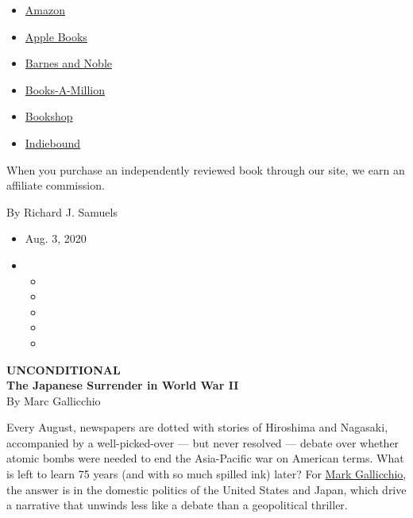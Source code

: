 \begin{itemize}
\tightlist
\item
  \href{https://www.amazon.com/gp/search?index=books\&tag=NYTBSREV-20\&field-keywords=Unconditional\%3A+The+Japanese+Surrender+in+World+War+II+Marc+Gallicchio}{Amazon}
\item
  \href{https://du-gae-books-dot-nyt-du-prd.appspot.com/buy?title=Unconditional\%3A+The+Japanese+Surrender+in+World+War+II\&author=Marc+Gallicchio}{Apple
  Books}
\item
  \href{https://www.anrdoezrs.net/click-7990613-11819508?url=https\%3A\%2F\%2Fwww.barnesandnoble.com\%2Fs\%2FUnconditional\%3A+The+Japanese+Surrender+in+World+War+II+Marc+Gallicchio}{Barnes
  and Noble}
\item
  \href{https://www.anrdoezrs.net/click-7990613-35140?url=https\%3A\%2F\%2Fwww.booksamillion.com\%2Fsearch\%3Fquery\%3DUnconditional\%253A\%2BThe\%2BJapanese\%2BSurrender\%2Bin\%2BWorld\%2BWar\%2BII\%2BMarc\%2BGallicchio}{Books-A-Million}
\item
  \href{https://bookshop.org/books?keywords=Unconditional\%3A+The+Japanese+Surrender+in+World+War+II}{Bookshop}
\item
  \href{https://www.indiebound.org/search/book?searchfor=Unconditional\%3A+The+Japanese+Surrender+in+World+War+II+Marc+Gallicchio\&aff=NYT}{Indiebound}
\end{itemize}

When you purchase an independently reviewed book through our site, we
earn an affiliate commission.

By Richard J. Samuels

\begin{itemize}
\item
  Aug. 3, 2020
\item
  \begin{itemize}
  \item
  \item
  \item
  \item
  \item
  \end{itemize}
\end{itemize}

\textbf{UNCONDITIONAL}\\
\textbf{The Japanese Surrender in World War II}\\
By Marc Gallicchio

Every August, newspapers are dotted with stories of Hiroshima and
Nagasaki, accompanied by a well-picked-over --- but never resolved ---
debate over whether atomic bombs were needed to end the Asia-Pacific war
on American terms. What is left to learn 75 years (and with so much
spilled ink) later? For
\href{https://www1.villanova.edu/villanova/artsci/history/facstaff/biodetail.html?mail=marc.gallicchio@villanova.edu\&xsl=bio_long}{Mark
Gallicchio}, the answer is in the domestic politics of the United States
and Japan, which drive a narrative that unwinds less like a debate than
a geopolitical thriller.

